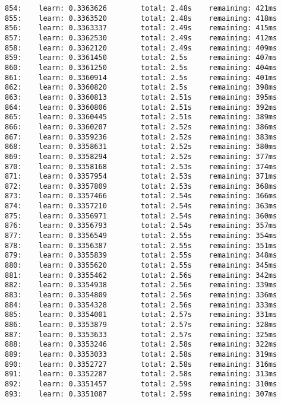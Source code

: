 \documentclass[11pt]{article}
\begin{document}
\begin{Verbatim}[commandchars=\\\{\}]
854:    learn: 0.3363626        total: 2.48s    remaining: 421ms
855:    learn: 0.3363520        total: 2.48s    remaining: 418ms
856:    learn: 0.3363337        total: 2.49s    remaining: 415ms
857:    learn: 0.3362530        total: 2.49s    remaining: 412ms
858:    learn: 0.3362120        total: 2.49s    remaining: 409ms
859:    learn: 0.3361450        total: 2.5s     remaining: 407ms
860:    learn: 0.3361250        total: 2.5s     remaining: 404ms
861:    learn: 0.3360914        total: 2.5s     remaining: 401ms
862:    learn: 0.3360820        total: 2.5s     remaining: 398ms
863:    learn: 0.3360813        total: 2.51s    remaining: 395ms
864:    learn: 0.3360806        total: 2.51s    remaining: 392ms
865:    learn: 0.3360445        total: 2.51s    remaining: 389ms
866:    learn: 0.3360207        total: 2.52s    remaining: 386ms
867:    learn: 0.3359236        total: 2.52s    remaining: 383ms
868:    learn: 0.3358631        total: 2.52s    remaining: 380ms
869:    learn: 0.3358294        total: 2.52s    remaining: 377ms
870:    learn: 0.3358168        total: 2.53s    remaining: 374ms
871:    learn: 0.3357954        total: 2.53s    remaining: 371ms
872:    learn: 0.3357809        total: 2.53s    remaining: 368ms
873:    learn: 0.3357466        total: 2.54s    remaining: 366ms
874:    learn: 0.3357210        total: 2.54s    remaining: 363ms
875:    learn: 0.3356971        total: 2.54s    remaining: 360ms
876:    learn: 0.3356793        total: 2.54s    remaining: 357ms
877:    learn: 0.3356549        total: 2.55s    remaining: 354ms
878:    learn: 0.3356387        total: 2.55s    remaining: 351ms
879:    learn: 0.3355839        total: 2.55s    remaining: 348ms
880:    learn: 0.3355620        total: 2.55s    remaining: 345ms
881:    learn: 0.3355462        total: 2.56s    remaining: 342ms
882:    learn: 0.3354938        total: 2.56s    remaining: 339ms
883:    learn: 0.3354809        total: 2.56s    remaining: 336ms
884:    learn: 0.3354328        total: 2.56s    remaining: 333ms
885:    learn: 0.3354001        total: 2.57s    remaining: 331ms
886:    learn: 0.3353879        total: 2.57s    remaining: 328ms
887:    learn: 0.3353633        total: 2.57s    remaining: 325ms
888:    learn: 0.3353246        total: 2.58s    remaining: 322ms
889:    learn: 0.3353033        total: 2.58s    remaining: 319ms
890:    learn: 0.3352727        total: 2.58s    remaining: 316ms
891:    learn: 0.3352287        total: 2.58s    remaining: 313ms
892:    learn: 0.3351457        total: 2.59s    remaining: 310ms
893:    learn: 0.3351087        total: 2.59s    remaining: 307ms

\end{Verbatim}
\end{document}
